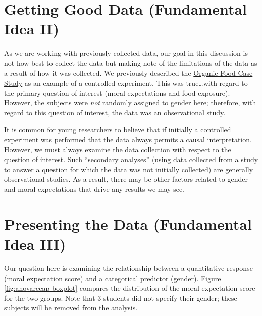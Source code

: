 \documentclass[
]{book}
\theoremstyle{plain}
\theoremstyle{mydefn}
\theoremstyle{myexmpl}
\theoremstyle{remark}
\begin{document}
\hypertarget{getting-good-data-fundamental-idea-ii-1}{%
\section{Getting Good Data (Fundamental Idea II)}\label{getting-good-data-fundamental-idea-ii-1}}

As we are working with previously collected data, our goal in this discussion is not how best to collect the data but making note of the limitations of the data as a result of how it was collected. We previously described the \protect\hyperlink{CaseOrganic}{Organic Food Case Study} as an example of a controlled experiment. This was true\ldots with regard to the primary question of interest (moral expectations and food exposure). However, the subjects were \emph{not} randomly assigned to gender here; therefore, with regard to this question of interest, the data was an observational study.

It is common for young researchers to believe that if initially a controlled experiment was performed that the data always permits a causal interpretation. However, we must always examine the data collection with respect to the question of interest. Such ``secondary analyses'' (using data collected from a study to answer a question for which the data was not initially collected) are generally observational studies. As a result, there may be other factors related to gender and moral expectations that drive any results we may see.

\hypertarget{presenting-the-data-fundamental-idea-iii-1}{%
\section{Presenting the Data (Fundamental Idea III)}\label{presenting-the-data-fundamental-idea-iii-1}}

Our question here is examining the relationship between a quantitative response (moral expectation score) and a categorical predictor (gender). Figure \ref{fig:anovarecap-boxplot} compares the distribution of the moral expectation score for the two groups. Note that 3 students did not specify their gender; these subjects will be removed from the analysis.
\end{document}
